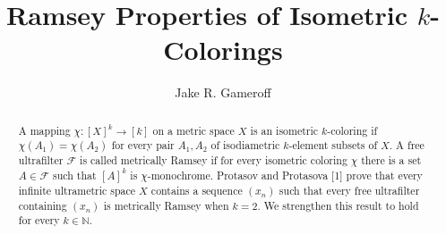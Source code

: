 
\makeatletter
\def\@settitle{\begin{center}%
  \baselineskip14\p@\relax
    \normalfont\Large%
\@title
  \end{center}%
}
\makeatother

\title{Ramsey Properties of Isometric $k$-Colorings}
\author{Jake R. Gameroff}

\begin{abstract}
	A mapping \( \chi : [X]^{k} \to [k] \) on a metric space \( X \) is an isometric \( k \)-coloring if \( \chi(A_1) = \chi(A_2) \) for every pair \( A_1,A_2 \) of isodiametric \( k \)-element subsets of \( X \). A free ultrafilter \( \mathcal{F}  \) is called metrically Ramsey if for every isometric coloring \( \chi \) there is a set \( A \in \mathcal{F}  \) such that \( [A]^{k}  \) is \( \chi \)-monochrome. Protasov and Protasova [1] prove that every infinite ultrametric space \( X \) contains a sequence \( (x_{n}) \) such that every free ultrafilter containing \( (x_{n}) \) is metrically Ramsey when \( k = 2 \). We strengthen this result to hold for every \( k \in \mathbb{N}  \).
\end{abstract}
\maketitle




\newpage

